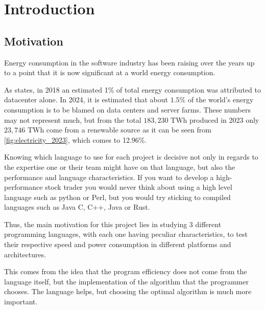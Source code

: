 \chapter{Introduction}\label{chap:introduction}



\section{Motivation}\label{sec:motivation}
Energy consumption in the software industry has been raising over the years up to a point that it is now significant at a world energy consumption. %

As \cite{recalibrating-datacenter} states, in 2018 an estimated 1\% of total energy consumption was attributed to datacenter alone. In 2024, it is estimated that about $1.5\%$ of the world's energy consumption is to be blamed on data centers and server farms. These numbers may not represent much, but from the total $183,230$ TWh produced in 2023 \cite{energy-production-consumption} only $23,746$ TWh come from a renewable source as it can be seen from \autoref{fig:electricity_2023}, which comes to 12.96\%.

Knowing which language to use for each project is decisive not only in regards to the expertise one or their team might have on that language, but also the performance and language characteristics. If you want to develop a high-performance stock trader you would never think about using a high level language such as python or Perl, but you would try sticking to compiled languages such as Java C, C++, Java or Rust. 

Thus, the main motivation for this project lies in studying 3 different programming languages, with each one having peculiar characteristics, to test their respective speed and power consumption in different platforms and architectures. 

This comes from the idea that the program efficiency does not come from the language itself, but the implementation of the algorithm that the programmer chooses. The language helps, but choosing the optimal algorithm is much more important.

